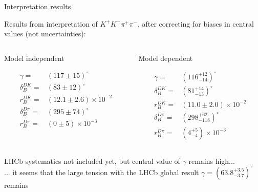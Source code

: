 \documentclass[xcolor={dvipsnames}]{beamer}
\begin{document}
\begin{frame}{Interpretation results}
  \begin{center}
    {\large Results from interpretation of $K^+K^-\pi^+\pi^-$, after correcting for biases in central values (not uncertainties):}
  \end{center}
  \vspace{-0.5cm}
  \begin{columns}
    \begin{column}{0.5\textwidth}
      \begin{center}
        Model independent
      \end{center}
      \begin{align*}
        \gamma =& (117 \pm 15)^\circ \\
        \delta_B^{DK} =& (83 \pm 12)^\circ \\
        r_B^{DK} =& (12.1 \pm 2.6)\times10^{-2} \\
        \delta_B^{D\pi} =& (295 \pm 74)^\circ \\
        r_B^{D\pi} =& (0 \pm 5)\times10^{-3}
      \end{align*}
    \end{column}
    \begin{column}{0.5\textwidth}
      \begin{center}
        Model dependent
      \end{center}
      \begin{align*}
        \gamma =& (116^{+12}_{-14})^\circ \\
        \delta_B^{DK} =& (81^{+14}_{-13})^\circ \\
        r_B^{DK} =& (11.0 \pm 2.0)\times10^{-2} \\
        \delta_B^{D\pi} =& (298^{+62}_{-118})^\circ \\
        r_B^{D\pi} =& (4^{+5}_{-4})\times10^{-3}
      \end{align*}
    \end{column}
  \end{columns}
  \vspace{0.2cm}
  \begin{center}
    LHCb systematics not included yet, but central value of $\gamma$ remains high...\\
    ... it seems that the large tension with the LHCb global result $\gamma = (63.8^{+3.5}_{-3.7})^\circ$ remains
  \end{center}
\end{frame}
\end{document}
